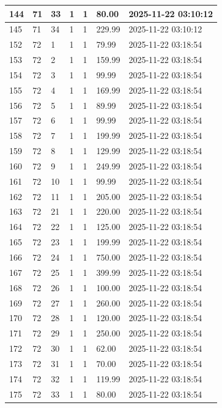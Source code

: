 \begin{longtable}{|l|l|l|l|l|l|l|}
144 & 71 & 33 & 1 & 1 & 80.00 & 2025-11-22 03:10:12 \\ \hline 
145 & 71 & 34 & 1 & 1 & 229.99 & 2025-11-22 03:10:12 \\ \hline 
152 & 72 & 1 & 1 & 1 & 79.99 & 2025-11-22 03:18:54 \\ \hline 
153 & 72 & 2 & 1 & 1 & 159.99 & 2025-11-22 03:18:54 \\ \hline 
154 & 72 & 3 & 1 & 1 & 99.99 & 2025-11-22 03:18:54 \\ \hline 
155 & 72 & 4 & 1 & 1 & 169.99 & 2025-11-22 03:18:54 \\ \hline 
156 & 72 & 5 & 1 & 1 & 89.99 & 2025-11-22 03:18:54 \\ \hline 
157 & 72 & 6 & 1 & 1 & 99.99 & 2025-11-22 03:18:54 \\ \hline 
158 & 72 & 7 & 1 & 1 & 199.99 & 2025-11-22 03:18:54 \\ \hline 
159 & 72 & 8 & 1 & 1 & 129.99 & 2025-11-22 03:18:54 \\ \hline 
160 & 72 & 9 & 1 & 1 & 249.99 & 2025-11-22 03:18:54 \\ \hline 
161 & 72 & 10 & 1 & 1 & 99.99 & 2025-11-22 03:18:54 \\ \hline 
162 & 72 & 11 & 1 & 1 & 205.00 & 2025-11-22 03:18:54 \\ \hline 
163 & 72 & 21 & 1 & 1 & 220.00 & 2025-11-22 03:18:54 \\ \hline 
164 & 72 & 22 & 1 & 1 & 125.00 & 2025-11-22 03:18:54 \\ \hline 
165 & 72 & 23 & 1 & 1 & 199.99 & 2025-11-22 03:18:54 \\ \hline 
166 & 72 & 24 & 1 & 1 & 750.00 & 2025-11-22 03:18:54 \\ \hline 
167 & 72 & 25 & 1 & 1 & 399.99 & 2025-11-22 03:18:54 \\ \hline 
168 & 72 & 26 & 1 & 1 & 100.00 & 2025-11-22 03:18:54 \\ \hline 
169 & 72 & 27 & 1 & 1 & 260.00 & 2025-11-22 03:18:54 \\ \hline 
170 & 72 & 28 & 1 & 1 & 120.00 & 2025-11-22 03:18:54 \\ \hline 
171 & 72 & 29 & 1 & 1 & 250.00 & 2025-11-22 03:18:54 \\ \hline 
172 & 72 & 30 & 1 & 1 & 62.00 & 2025-11-22 03:18:54 \\ \hline 
173 & 72 & 31 & 1 & 1 & 70.00 & 2025-11-22 03:18:54 \\ \hline 
174 & 72 & 32 & 1 & 1 & 119.99 & 2025-11-22 03:18:54 \\ \hline 
175 & 72 & 33 & 1 & 1 & 80.00 & 2025-11-22 03:18:54 \\ \hline 

\end{longtable}
